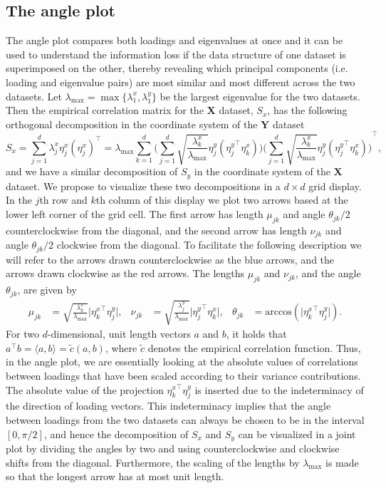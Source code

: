 \documentclass[]{interact}
\theoremstyle{plain}%
\theoremstyle{definition}
\theoremstyle{remark}
\newcommand{\acos}{\text{arccos}}
\begin{document}
\subsection{The angle plot}
The angle plot compares both loadings and eigenvalues at once and it can be used to understand the information loss if the data structure of one dataset is superimposed on the other, thereby revealing which principal components (i.e. loading and eigenvalue pairs) are most similar and most different across the two datasets. Let $\lambda_{\max} = \max\{ \lambda_{1}^x, \lambda_{1}^y \}$ be the largest eigenvalue for the two datasets. Then the empirical correlation matrix for the $\mathbf{X}$ dataset, $S_x$, has the following orthogonal decomposition in the coordinate system of the $\mathbf{Y}$ dataset
\begin{equation*}
S_x = \sum_{j=1}^d \lambda_{j}^x \eta_{j}^x ({\eta_{j}^x})^\top
= \lambda_{\max} \sum_{k=1}^d
\Bigg( \sum_{j=1}^d \sqrt{\frac{\lambda_{k}^x}{\lambda_{\max}}} \eta_{j}^y ({\eta_{j}^y}^\top \eta_{k}^x) \Bigg)
{\Bigg( \sum_{j=1}^d \sqrt{\frac{\lambda_{k}^x}{\lambda_{\max}}} \eta_{j}^y ({\eta_{j}^y}^\top \eta_{k}^x) \Bigg)}^\top,
\end{equation*}
and we have a similar decomposition of $S_y$ in the coordinate system of the $\mathbf{X}$ dataset. We propose to visualize these two decompositions in a $d \times d$ grid display. In the $j$th row and $k$th column of this display we plot two arrows based at the lower left corner of the grid cell. The first arrow has length $\mu_{jk}$ and angle $\theta_{jk}/2$ counterclockwise from the diagonal, and the second arrow has length $\nu_{jk}$ and angle $\theta_{jk}/2$ clockwise from the diagonal. To facilitate the following description we will refer to the arrows drawn counterclockwise as the blue arrows, and the arrows drawn clockwise as the red arrows. The lengths $\mu_{jk}$ and $\nu_{jk}$, and the angle $\theta_{jk}$, are given by
\begin{align*}
\mu_{jk} &= \sqrt{\frac{\lambda_{k}^x}{\lambda_{\max}}} \lvert {\eta_{k}^x}^\top \eta_{j}^y \rvert, &
\nu_{jk} &= \sqrt{\frac{\lambda_{j}^y}{\lambda_{\max}}} \lvert {\eta_{j}^y}^\top \eta_{k}^x \rvert, &
\theta_{jk} &= \acos(\lvert {\eta_{k}^x}^\top \eta_{j}^y \rvert).
\end{align*}
For two $d$-dimensional, unit length vectors $a$ and $b$, it holds that $ a^\top b = \langle a, b \rangle = \tilde{c}(a,b)$, where $\tilde{c}$ denotes the empirical correlation function. Thus, in the angle plot, we are essentially looking at the absolute values of correlations between loadings that have been scaled according to their variance contributions. The absolute value of the projection ${\eta_{k}^x}^\top \eta_{j}^y$ is inserted due to the indeterminacy of the direction of loading vectors. This indeterminacy implies that the angle between loadings from the two datasets can always be chosen to be in the interval $[0,\pi/2]$, and hence the decomposition of $S_x$ and $S_y$ can be visualized in a joint plot by dividing the angles by two and using counterclockwise and clockwise shifts from the diagonal. Furthermore, the scaling of the lengths by $\lambda_{\max}$ is made so that the longest arrow has at most unit length. 
\end{document}
